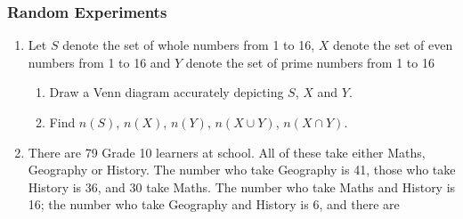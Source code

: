             \subsubsection{  Random Experiments }
            \nopagebreak
            
          \label{m39377*id111123}\begin{enumerate}[noitemsep, label=\textbf{\arabic*}. ] 
            \label{m39377*uid16}\item  Let \begin{math}S\end{math} denote the set of
whole numbers from 1 to 16,
\begin{math}X\end{math} denote the
set of even numbers from 1 to 16 and
\begin{math}Y\end{math} denote the
set of prime numbers from 1 to 16\label{m39377*id111223}\begin{enumerate}[noitemsep, label=\textbf{\alph*}. ] 
            \label{m39377*uid17}\item Draw a Venn
diagram accurately depicting \begin{math}S\end{math},
\begin{math}X\end{math} and \begin{math}Y\end{math}.
\label{m39377*uid18}\item Find \begin{math}n\left(S\right)\end{math}, \begin{math}n\left(X\right)\end{math}, \begin{math}n\left(Y\right)\end{math}, \begin{math}n\left(X\cup Y\right)\end{math}, \begin{math}n\left(X\cap Y\right)\end{math}.
\end{enumerate}
                \label{m39377*uid19}\item There are 79 Grade 10 learners at school. All of
these take either Maths, Geography or History. The number who take Geography is
41, those who take History is 36, and 30 take Maths. The number who take Maths
and History is 16; the number who take Geography and History is 6, and there are

\end{enumerate}
